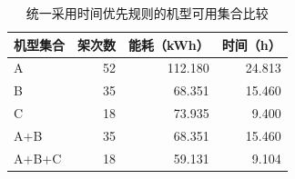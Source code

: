 \begin{table}[!htbp]
\centering
\caption{统一采用时间优先规则的机型可用集合比较}
\label{tab:q1-policies}
\small
\setlength{\tabcolsep}{4pt}
\renewcommand{\arraystretch}{1.10}
\begin{tabular}{@{}lrrr@{}}
\toprule
机型集合 & 架次数 & 能耗（kWh） & 时间（h） \\
\midrule
A & 52 & 112.180 & 24.813 \\
B & 35 & 68.351 & 15.460 \\
C & 18 & 73.935 & 9.400 \\
A+B & 35 & 68.351 & 15.460 \\
A+B+C & 18 & 59.131 & 9.104 \\
\bottomrule
\end{tabular}
\end{table}

